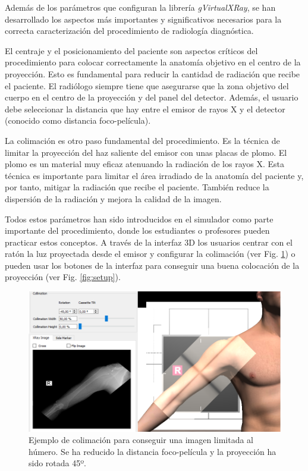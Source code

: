 Además de los parámetros que configuran la librería \emph{gVirtualXRay}, se han desarrollado los aspectos más importantes y significativos necesarios para la correcta caracterización del procedimiento de radiología diagnóstica. 

El centraje y el posicionamiento del paciente son aspectos críticos del procedimiento para colocar correctamente la anatomía objetivo en el centro de la proyección. Esto es fundamental para reducir la cantidad de radiación que recibe el paciente. El radiólogo siempre tiene que asegurarse que la zona objetivo del cuerpo en el centro de la proyección y del panel del detector. Además, el usuario debe seleccionar la distancia que hay entre el emisor de rayos X y el detector (conocido como distancia foco-película).

La colimación es otro paso fundamental del procedimiento. Es la técnica de limitar la proyección del haz saliente del emisor con unas placas de plomo. El plomo es un material muy eficaz atenuando la radiación de los rayos X. Esta técnica es importante para limitar el área irradiado de la anatomía del paciente y, por tanto,  mitigar la radiación que recibe el paciente. También reduce la dispersión de la radiación y mejora la calidad de la imagen.

Todos estos parámetros han sido introducidos en el simulador como parte importante del procedimiento, donde los estudiantes o profesores pueden practicar estos conceptos. A través de la interfaz 3D los usuarios centrar con el ratón la luz proyectada desde el emisor y configurar la colimación (ver Fig. \ref{fig:collimation}) o pueden usar los botones de la interfaz para conseguir una buena colocación de la proyección (ver Fig. \ref{fig:setup}).

\begin{figure}[tb]
\centering
\includegraphics[width=0.9\linewidth]{IMG/collimation.png}
\caption{\label{fig:collimation} Ejemplo de colimación para conseguir una imagen limitada al húmero. Se ha reducido la distancia foco-película y la proyección ha sido rotada  45º. }
\end{figure}

